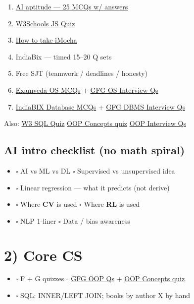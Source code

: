 \documentclass[a4paper,9pt]{extarticle}
\begin{document}
\begin{enumerate}
  \item[\textbf{A}] \href{https://www.javaguides.net/2024/05/ai-aptitude-test-25-mcq-questions.html}{AI aptitude --- 25 MCQs w/ answers}
  \item[\textbf{B}] \href{https://www.w3schools.com/js/js_quiz.asp}{W3Schools JS Quiz}
  \item[\textbf{C}] \href{https://help.imocha.io/kb/article/251/how-to-take-a-test-on-imocha}{How to take iMocha}
  \item[\textbf{D}] IndiaBix --- timed 15--20 Q sets
  \item[\textbf{E}] Free SJT (teamwork / deadlines / honesty)
  \item[\textbf{F}] \href{https://www.examveda.com/computer-fundamentals/practice-mcq-question-on-operating-system/}{Examveda OS MCQs}
        + \href{https://www.geeksforgeeks.org/operating-systems/operating-systems-interview-questions/}{GFG OS Interview Qs}
  \item[\textbf{G}] \href{https://www.indiabix.com/database/questions-and-answers/}{IndiaBIX Database MCQs}
        + \href{https://www.geeksforgeeks.org/commonly-asked-dbms-interview-questions/}{GFG DBMS Interview Qs}
\end{enumerate}
\noindent\small Also: \href{https://www.w3schools.com/sql/sql_quiz.asp}{W3 SQL Quiz} \textbar{}
\href{https://www.geeksforgeeks.org/quizzes/oop-concepts-gq/}{OOP Concepts quiz} \textbar{}
\href{https://www.geeksforgeeks.org/interview-prep/oops-interview-questions/}{OOP Interview Qs}

\subsection{AI intro checklist (no math spiral)}
\begin{itemize}
  \item $\square$ AI vs ML vs DL \quad $\square$ Supervised vs unsupervised idea
  \item $\square$ Linear regression --- what it predicts (not derive)
  \item $\square$ Where \textbf{CV} is used \quad $\square$ Where \textbf{RL} is used
  \item $\square$ NLP 1-liner \quad $\square$ Data / bias awareness
\end{itemize}

\section{2) Core CS}
\begin{itemize}
  \item $\square$ F + G quizzes \quad $\square$
        \href{https://www.geeksforgeeks.org/interview-prep/oops-interview-questions/}{GFG OOP Qs} +
        \href{https://www.geeksforgeeks.org/quizzes/oop-concepts-gq/}{OOP Concepts quiz}
  \item $\square$ SQL: INNER/LEFT JOIN; books by author X by hand
\end{itemize}
\end{document}
